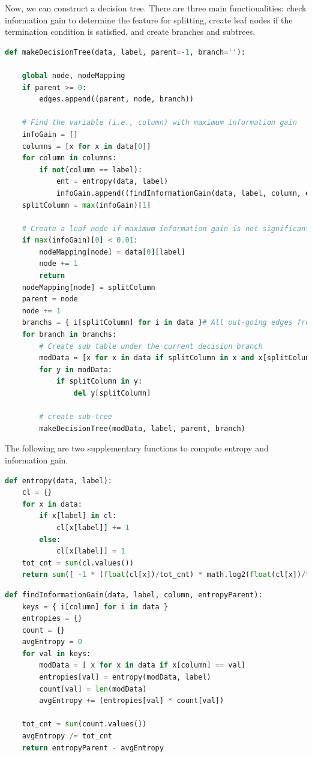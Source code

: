 Now, we can construct a decision tree. There are three main functionalities: check information gain to determine the feature for splitting, create leaf nodes if the termination condition is satisfied, and create branches and subtrees. 
\begin{lstlisting}[language=Python]
def makeDecisionTree(data, label, parent=-1, branch=''):

    global node, nodeMapping
    if parent >= 0:
        edges.append((parent, node, branch))

    # Find the variable (i.e., column) with maximum information gain
    infoGain = []
    columns = [x for x in data[0]]
    for column in columns:
        if not(column == label):
            ent = entropy(data, label)
            infoGain.append((findInformationGain(data, label, column, ent), column))
    splitColumn = max(infoGain)[1]

    # Create a leaf node if maximum information gain is not significant
    if max(infoGain)[0] < 0.01:
        nodeMapping[node] = data[0][label]
        node += 1
        return
    nodeMapping[node] = splitColumn
    parent = node
    node += 1
    branchs = { i[splitColumn] for i in data }# All out-going edges from current node
    for branch in branchs:
        # Create sub table under the current decision branch
        modData = [x for x in data if splitColumn in x and x[splitColumn] == branch]
        for y in modData:
            if splitColumn in y:
                del y[splitColumn]

        # create sub-tree
        makeDecisionTree(modData, label, parent, branch)
\end{lstlisting}

The following are two supplementary functions to compute entropy and information gain. 

\begin{lstlisting}[language=Python]
def entropy(data, label):
    cl = {}
    for x in data:
        if x[label] in cl:
            cl[x[label]] += 1
        else:
            cl[x[label]] = 1
    tot_cnt = sum(cl.values())
    return sum([ -1 * (float(cl[x])/tot_cnt) * math.log2(float(cl[x])/tot_cnt) for x in cl])
\end{lstlisting}


\begin{lstlisting}[language=Python]
def findInformationGain(data, label, column, entropyParent):
    keys = { i[column] for i in data }
    entropies = {}
    count = {}
    avgEntropy = 0
    for val in keys:
        modData = [ x for x in data if x[column] == val]
        entropies[val] = entropy(modData, label)
        count[val] = len(modData)
        avgEntropy += (entropies[val] * count[val])

    tot_cnt = sum(count.values())
    avgEntropy /= tot_cnt
    return entropyParent - avgEntropy
\end{lstlisting}

